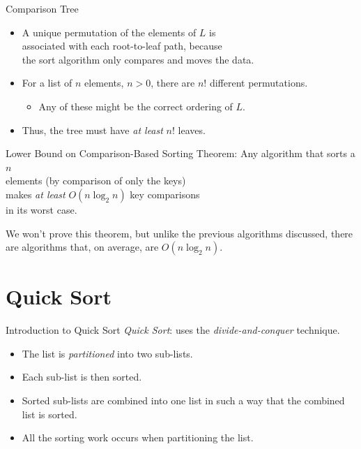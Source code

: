 \documentclass[14pt,aspectratio=1610]{beamer}
\begin{document}
\begin{frame}{Comparison Tree}
\begin{itemize}\setlength\itemsep{0.5em}
\item<+->
  A unique permutation of the elements of \(L\) is\\
  associated with each root-to-leaf path, because\\ the sort algorithm only compares and moves the data.
\item<+->
  For a list of \(n\) elements, \(n > 0\), there are \(n!\) different permutations.
  \begin{itemize}
  \item
    Any of these might be the correct ordering of \(L\).
  \end{itemize}
\item<+->
  Thus, the tree must have \emph{at least} \(n!\) leaves.
\end{itemize}
\end{frame}

\begin{frame}{Lower Bound on Comparison-Based Sorting}
\large
Theorem: Any algorithm that sorts a \(n\) \\
elements (by comparison of only the keys) \\
makes \emph{at least} \(O(n\log_2n)\) key comparisons\\
in its worst case.

\pause{}
We won't prove this theorem, but unlike the previous algorithms discussed, there are algorithms that, on average, are \(O(n\log_2n)\).
\end{frame}

\section{Quick Sort}

\begin{frame}{Introduction to Quick Sort}
\emph{Quick Sort}: uses the \textit{divide-and-conquer} technique.

\begin{itemize}\setlength\itemsep{0.5em}
\item
  The list is \textit{partitioned} into two sub-lists.
\item
  Each sub-list is then sorted.
\item
  Sorted sub-lists are combined into one list in such a way that the combined
  list is sorted.
\item
  All the sorting work occurs when partitioning the list.
\end{itemize}
\end{frame}
\end{document}
